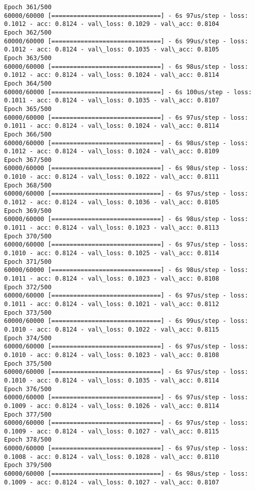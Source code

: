 \documentclass[11pt]{article}
\begin{document}
\begin{Verbatim}[commandchars=\\\{\}]
Epoch 361/500
60000/60000 [==============================] - 6s 97us/step - loss: 0.1012 - acc: 0.8124 - val\_loss: 0.1029 - val\_acc: 0.8104
Epoch 362/500
60000/60000 [==============================] - 6s 99us/step - loss: 0.1012 - acc: 0.8124 - val\_loss: 0.1035 - val\_acc: 0.8105
Epoch 363/500
60000/60000 [==============================] - 6s 98us/step - loss: 0.1012 - acc: 0.8124 - val\_loss: 0.1024 - val\_acc: 0.8114
Epoch 364/500
60000/60000 [==============================] - 6s 100us/step - loss: 0.1011 - acc: 0.8124 - val\_loss: 0.1035 - val\_acc: 0.8107
Epoch 365/500
60000/60000 [==============================] - 6s 97us/step - loss: 0.1011 - acc: 0.8124 - val\_loss: 0.1024 - val\_acc: 0.8114
Epoch 366/500
60000/60000 [==============================] - 6s 98us/step - loss: 0.1012 - acc: 0.8124 - val\_loss: 0.1024 - val\_acc: 0.8109
Epoch 367/500
60000/60000 [==============================] - 6s 98us/step - loss: 0.1010 - acc: 0.8124 - val\_loss: 0.1022 - val\_acc: 0.8111
Epoch 368/500
60000/60000 [==============================] - 6s 97us/step - loss: 0.1012 - acc: 0.8124 - val\_loss: 0.1036 - val\_acc: 0.8105
Epoch 369/500
60000/60000 [==============================] - 6s 98us/step - loss: 0.1011 - acc: 0.8124 - val\_loss: 0.1023 - val\_acc: 0.8113
Epoch 370/500
60000/60000 [==============================] - 6s 97us/step - loss: 0.1010 - acc: 0.8124 - val\_loss: 0.1025 - val\_acc: 0.8114
Epoch 371/500
60000/60000 [==============================] - 6s 98us/step - loss: 0.1011 - acc: 0.8124 - val\_loss: 0.1023 - val\_acc: 0.8108
Epoch 372/500
60000/60000 [==============================] - 6s 97us/step - loss: 0.1011 - acc: 0.8124 - val\_loss: 0.1021 - val\_acc: 0.8112
Epoch 373/500
60000/60000 [==============================] - 6s 99us/step - loss: 0.1010 - acc: 0.8124 - val\_loss: 0.1022 - val\_acc: 0.8115
Epoch 374/500
60000/60000 [==============================] - 6s 97us/step - loss: 0.1010 - acc: 0.8124 - val\_loss: 0.1023 - val\_acc: 0.8108
Epoch 375/500
60000/60000 [==============================] - 6s 97us/step - loss: 0.1010 - acc: 0.8124 - val\_loss: 0.1035 - val\_acc: 0.8114
Epoch 376/500
60000/60000 [==============================] - 6s 97us/step - loss: 0.1009 - acc: 0.8124 - val\_loss: 0.1026 - val\_acc: 0.8114
Epoch 377/500
60000/60000 [==============================] - 6s 97us/step - loss: 0.1009 - acc: 0.8124 - val\_loss: 0.1027 - val\_acc: 0.8115
Epoch 378/500
60000/60000 [==============================] - 6s 97us/step - loss: 0.1008 - acc: 0.8124 - val\_loss: 0.1028 - val\_acc: 0.8110
Epoch 379/500
60000/60000 [==============================] - 6s 98us/step - loss: 0.1009 - acc: 0.8124 - val\_loss: 0.1027 - val\_acc: 0.8107

\end{Verbatim}
\end{document}
